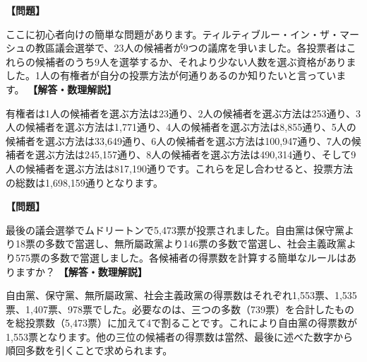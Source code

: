 \documentclass[10pt,a4paper,oneside,openany]{ltjsbook}
\begin{document}
\begin{tcolorbox}[colback=softblue,colframe=primaryblue,title=\textbf{第 105 問：教區議会選挙 （原題: THE PARISH COUNCIL ELECTION.）},arc=2mm,boxrule=1pt,breakable]
\textbf{【問題】}\par\vspace{0.3em}
ここに初心者向けの簡単な問題があります。ティルティブルー・イン・ザ・マーシュの教區議会選挙で、23人の候補者が9つの議席を爭いました。各投票者はこれらの候補者のうち9人を選挙するか、それより少ない人数を選ぶ資格がありました。1人の有権者が自分の投票方法が何通りあるのか知りたいと言っています。
\tcblower
\textbf{【解答・数理解説】}\par\vspace{0.3em}
有権者は1人の候補者を選ぶ方法は23通り、2人の候補者を選ぶ方法は253通り、3人の候補者を選ぶ方法は1,771通り、4人の候補者を選ぶ方法は8,855通り、5人の候補者を選ぶ方法は33,649通り、6人の候補者を選ぶ方法は100,947通り、7人の候補者を選ぶ方法は245,157通り、8人の候補者を選ぶ方法は490,314通り、そして9人の候補者を選ぶ方法は817,190通りです。これらを足し合わせると、投票方法の総数は1,698,159通りとなります。
\end{tcolorbox}

\begin{tcolorbox}[colback=softblue,colframe=primaryblue,title=\textbf{第 106 問：ムドリートンの議会選挙 （原題: THE MUDDLETOWN ELECTION.）},arc=2mm,boxrule=1pt,breakable]
\textbf{【問題】}\par\vspace{0.3em}
最後の議会選挙でムドリートンで5,473票が投票されました。自由黨は保守黨より18票の多数で當選し、無所屬政黨より146票の多数で當選し、社会主義政黨より575票の多数で當選しました。各候補者の得票数を計算する簡単なルールはありますか？
\tcblower
\textbf{【解答・数理解説】}\par\vspace{0.3em}
自由黨、保守黨、無所屬政黨、社会主義政黨の得票数はそれぞれ1,553票、1,535票、1,407票、978票でした。必要なのは、三つの多数（739票）を合計したものを総投票数（5,473票）に加えて4で割ることです。これにより自由黨の得票数が1,553票となります。他の三位の候補者の得票数は當然、最後に述べた数字から順回多数を引くことで求められます。
\end{tcolorbox}
\end{document}
